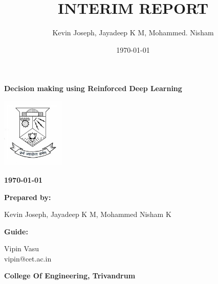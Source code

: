 \documentclass[twoside,letterpaper]{article}
\title{INTERIM REPORT}
\author{Kevin Joseph, Jayadeep K M, Mohammed. Nisham}
\date{\today}
\begin{document}


\bigskip

{\centering{}\bfseries\color{black}
Decision making using Reinforced Deep Learning
\par}


\bigskip

\centering
\includegraphics[width=3cm]{images/logo.jpg}

\bigskip

{\centering{}\bfseries\color{black}
\today
\par}


\bigskip


\bigskip

\bigskip

{\centering{}\bfseries\color{black}
Prepared by:
\par}

{\centering{}\color{black}
Kevin Joseph, Jayadeep K M, Mohammed Nisham K
\par}
\bigskip
{\centering{}\bfseries\color{black}
Guide:
\par}

{\centering{}\color{black}
Vipin Vasu\\
vipin@cet.ac.in\\
\par}
\bigskip
{\centering{}\bfseries\color{black}
College Of Engineering, Trivandrum
\par}


\bigskip

\setcounter{tocdepth}{9}
\renewcommand\contentsname{}

\bigskip
\flushleft
\setcounter{page}{1}
\end{document}

